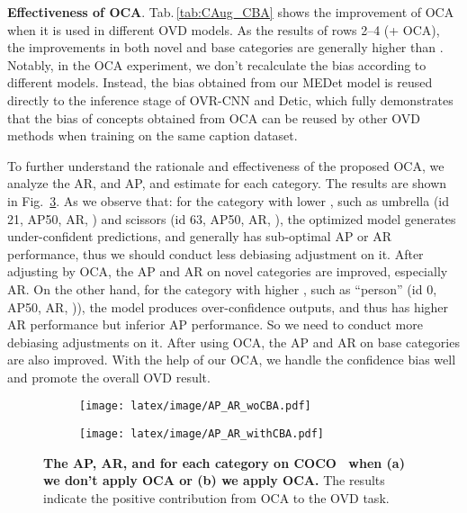 \documentclass[10pt,twocolumn,letterpaper]{article}
\begin{document}
\textbf{Effectiveness of OCA}.
Tab.\,\ref{tab:CAug_CBA} shows the improvement of OCA when it is used in different OVD models.
As the results of rows 2--4 (+ OCA), the improvements in both novel and base categories are generally higher than . 
Notably, in the OCA experiment, we don't recalculate the bias according to different models. Instead, the bias   obtained from our MEDet model is reused directly to the inference stage of OVR-CNN and Detic, which fully demonstrates that the bias of concepts obtained from OCA can be reused by other OVD methods when training on the same caption dataset. 

To further understand the rationale and effectiveness of the proposed OCA, we analyze the AR, and AP, and estimate  for each category. The results are shown in Fig.~\ref{fig:AR_AP_beta_CBA}.
As we observe that: for the category with lower , such as umbrella (id 21,  AP50,  AR, ) and scissors (id 63,  AP50,  AR, ), the optimized model generates under-confident predictions, and generally has sub-optimal AP or AR performance, thus we should conduct less debiasing adjustment  on it. After adjusting by OCA, the AP and AR on novel categories are improved, especially AR.
On the other hand, for the category with higher , such as ``person'' (id 0,  AP50,  AR, )), the model produces over-confidence outputs, and thus has higher AR performance but inferior AP performance.
So we need to conduct more debiasing adjustments on it.
After using OCA, the AP and AR on base categories are also improved. 
With the help of our OCA, we handle the confidence bias well and promote the overall OVD result.






\begin{figure}[tbp]
  \centering
  \begin{subfigure}[t]{.48\textwidth}
        \centering
        \texttt{[image: latex/image/AP\_AR\_woCBA.pdf]}
        \caption{}
        \label{fig:AP_AR_woCBA}
  \end{subfigure}
  \begin{subfigure}[t]{.48\textwidth}
        \centering
        \texttt{[image: latex/image/AP\_AR\_withCBA.pdf]}
        \caption{}
        \label{fig:AP_AR_with_CBA}
  \end{subfigure}
  \caption{\textbf{The AP, AR, and  for each category on COCO~\cite{coco_zeroshot} when \textbf{(a)} we don't apply OCA or \textbf{(b)} we apply OCA.}
  The results indicate the positive contribution from OCA to the OVD task.}
  \label{fig:AR_AP_beta_CBA}
\end{figure}
\end{document}

